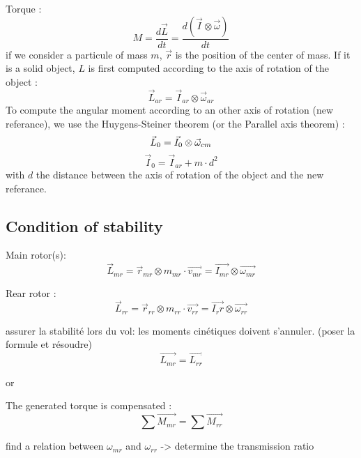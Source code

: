 \documentclass[12pt,a4paper]{article}
\begin{document}
Torque : 
\begin{equation}
M = \frac{d\vec{L}}{dt}=\frac{d(\vec{I} \otimes \vec{\omega})}{dt}
\end{equation}
\medbreak
if we consider a particule of mass $m$, $\vec{r}$ is the position of the center of mass.
If it is a solid object, $L$ is first computed according to the axis of rotation of the object : 
\begin{equation}
\vec{L}_{ar}=\vec{I}_{ar} \otimes \vec{\omega}_{ar}
\end{equation}
To compute the angular moment according to an other axis of rotation (new referance), we use the Huygens-Steiner theorem (or the Parallel axis theorem) : 
\begin{equation}
\vec{L}_{0}=\vec{I}_{0} \otimes \vec{\omega}_{cm}\\
\end{equation}
\begin{equation}
\vec{I}_{0} = \vec{I}_{ar} + m\cdot d^2
\end{equation}
with $d$ the distance between the axis of rotation of the object and the new referance. 
\subsection{Condition of stability}

Main rotor(s):
\begin{equation}
\vec{L}_{mr}=\vec{r}_{mr} \otimes m_{mr} \cdot \vec{v_{mr}}=\vec{I_{mr}} \otimes \vec{\omega_{mr}}
\end{equation}


Rear rotor : 
\begin{equation}
\vec{L}_{rr}=\vec{r}_{rr} \otimes m_{rr} \cdot \vec{v_{rr}}=\vec{I_rr} \otimes \vec{\omega_{rr}}
\end{equation}

assurer la stabilité lors du vol: les moments cinétiques doivent s'annuler. (poser la formule et résoudre)
\begin{equation}
\vec{L_{mr}}=\vec{L_{rr}}
\end{equation}

or

The generated torque is compensated : 
\begin{equation}
\sum \vec{M_{mr}}=\sum \vec{M_{rr}}
\end{equation}

find a relation between $\omega_{mr}$ and $\omega_{rr}$ -> determine the transmission ratio
\end{document}
